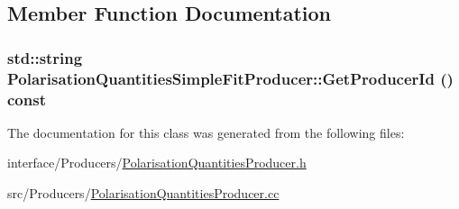 \subsection{Member Function Documentation}
\hypertarget{classPolarisationQuantitiesSimpleFitProducer_abb2cbe3680b39d8a4f3052dcd4088997}{
\subsubsection[{GetProducerId}]{\setlength{\rightskip}{0pt plus 5cm}std::string PolarisationQuantitiesSimpleFitProducer::GetProducerId () const}}
\label{classPolarisationQuantitiesSimpleFitProducer_abb2cbe3680b39d8a4f3052dcd4088997}


The documentation for this class was generated from the following files:\begin{DoxyCompactItemize}
\item 
interface/Producers/\hyperlink{PolarisationQuantitiesProducer_8h}{PolarisationQuantitiesProducer.h}\item 
src/Producers/\hyperlink{PolarisationQuantitiesProducer_8cc}{PolarisationQuantitiesProducer.cc}\end{DoxyCompactItemize}

